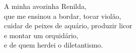 \thispagestyle{empty}

\vspace*{\fill}

\begin{dedication}
    A minha avozinha Renilda, \\
    que me ensinou a bordar, tocar violão, \\
    cuidar de peixes de aquário, produzir licor \\
    e montar um orquidário, \\
    e de quem herdei o diletantismo.    \vspace{\baselineskip}
\end{dedication}



%	
